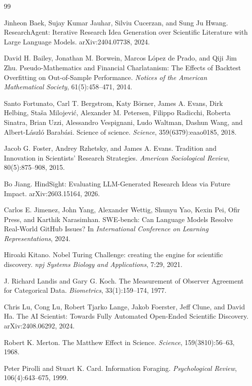 \documentclass[11pt]{article}
\begin{document}
\begin{thebibliography}{99}

Jinheon Baek, Sujay Kumar Jauhar, Silviu Cucerzan, and Sung Ju Hwang.
ResearchAgent: Iterative Research Idea Generation over Scientific Literature
with Large Language Models. arXiv:2404.07738, 2024.

David H. Bailey, Jonathan M. Borwein, Marcos L\'opez de Prado, and Qiji Jim
Zhu. Pseudo-Mathematics and Financial Charlatanism: The Effects of Backtest
Overfitting on Out-of-Sample Performance. \emph{Notices of the American
Mathematical Society}, 61(5):458--471, 2014.

Santo Fortunato, Carl T. Bergstrom, Katy B\"orner, James A. Evans, Dirk
Helbing, Sta\v{s}a Milojevi\'c, Alexander M. Petersen, Filippo Radicchi,
Roberta Sinatra, Brian Uzzi, Alessandro Vespignani, Ludo Waltman, Dashun
Wang, and Albert-L\'aszl\'o Barab\'asi. Science of science.
\emph{Science}, 359(6379):eaao0185, 2018.

Jacob G. Foster, Andrey Rzhetsky, and James A. Evans. Tradition and
Innovation in Scientists' Research Strategies. \emph{American Sociological
Review}, 80(5):875--908, 2015.

Bo Jiang. HindSight: Evaluating LLM-Generated Research Ideas via Future
Impact. arXiv:2603.15164, 2026.

Carlos E. Jimenez, John Yang, Alexander Wettig, Shunyu Yao, Kexin Pei, Ofir
Press, and Karthik Narasimhan. SWE-bench: Can Language Models Resolve
Real-World GitHub Issues? In \emph{International Conference on Learning
Representations}, 2024.

Hiroaki Kitano. Nobel Turing Challenge: creating the engine for scientific
discovery. \emph{npj Systems Biology and Applications}, 7:29, 2021.

J. Richard Landis and Gary G. Koch. The Measurement of Observer Agreement
for Categorical Data. \emph{Biometrics}, 33(1):159--174, 1977.

Chris Lu, Cong Lu, Robert Tjarko Lange, Jakob Foerster, Jeff Clune, and
David Ha. The AI Scientist: Towards Fully Automated Open-Ended Scientific
Discovery. arXiv:2408.06292, 2024.

Robert K. Merton. The Matthew Effect in Science. \emph{Science},
159(3810):56--63, 1968.

Peter Pirolli and Stuart K. Card. Information Foraging.
\emph{Psychological Review}, 106(4):643--675, 1999.


\end{thebibliography}
\end{document}
